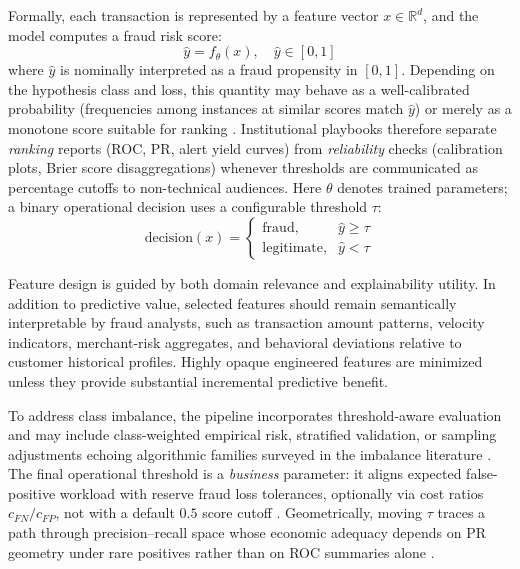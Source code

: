 Formally, each transaction is represented by a feature vector $x \in \mathbb{R}^d$, and the model computes a fraud risk score:
\begin{equation}
\hat{y} = f_{\theta}(x), \quad \hat{y} \in [0,1]
\end{equation}
where $\hat{y}$ is nominally interpreted as a fraud propensity in $[0,1]$. Depending on the hypothesis class and loss, this quantity may behave as a well-calibrated probability (frequencies among instances at similar scores match $\hat{y}$) or merely as a monotone score suitable for ranking \cite{niculescu_caruana_calib2005,molnarInterpretableMachineLearningBook}. Institutional playbooks therefore separate \emph{ranking} reports (ROC, PR, alert yield curves) from \emph{reliability} checks (calibration plots, Brier score disaggregations) whenever thresholds are communicated as percentage cutoffs to non-technical audiences. Here $\theta$ denotes trained parameters; a binary operational decision uses a configurable threshold $\tau$:
\begin{equation}
\text{decision}(x) =
\begin{cases}
\text{fraud}, & \hat{y} \geq \tau \\
\text{legitimate}, & \hat{y} < \tau
\end{cases}
\end{equation}

Feature design is guided by both domain relevance and explainability utility. In addition to predictive value, selected features should remain semantically interpretable by fraud analysts, such as transaction amount patterns, velocity indicators, merchant-risk aggregates, and behavioral deviations relative to customer historical profiles. Highly opaque engineered features are minimized unless they provide substantial incremental predictive benefit.

To address class imbalance, the pipeline incorporates threshold-aware evaluation and may include class-weighted empirical risk, stratified validation, or sampling adjustments echoing algorithmic families surveyed in the imbalance literature \cite{he_garcia_imbalanced2009,fraud_handbook}. The final operational threshold is a \emph{business} parameter: it aligns expected false-positive workload with reserve fraud loss tolerances, optionally via cost ratios $c_{FN}/c_{FP}$, not with a default $0.5$ score cutoff \cite{fraud_handbook}. Geometrically, moving $\tau$ traces a path through precision--recall space whose economic adequacy depends on PR geometry under rare positives rather than on ROC summaries alone \cite{davis_goadrich_icml06}.

